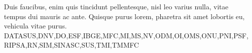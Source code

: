 Duis faucibus, enim quis tincidunt pellentesque, nisl leo varius nulla, vitae tempus dui mauris ac ante. Quisque purus lorem, pharetra sit amet lobortis eu, vehicula vitae purus.
\acrlong{DATASUS},\acrlong{DNV},\acrlong{DO},\acrlong{ESF},\acrlong{IBGE},\acrlong{MFC},\acrlong{MI},\acrlong{MS},\acrlong{NV},\acrlong{ODM},\acrlong{OI},\acrlong{OMS},\acrlong{ONU},\acrlong{PNI},\acrlong{PSF},\acrlong{RIPSA},\acrlong{RN},\acrlong{SIM},\acrlong{SINASC},\acrlong{SUS},\acrlong{TMI},\acrlong{TMMFC}

